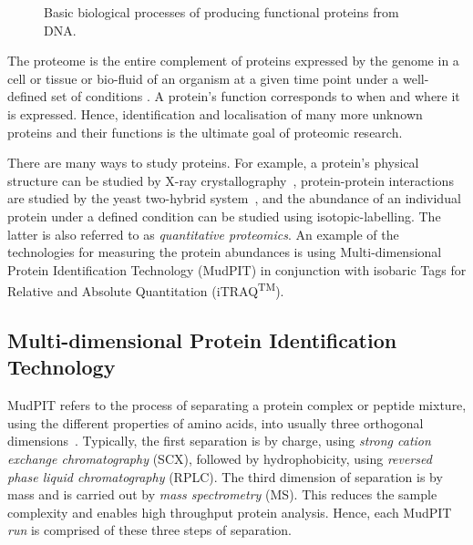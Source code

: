 \documentclass[11pt,a4paper]{article}
\begin{document}
\begin{figure}[hbt]
\caption{Basic biological processes of producing functional proteins from DNA.}
\label{fig:processes}
\end{figure}

The proteome is the entire complement of proteins expressed by the genome in a cell or tissue or bio-fluid of an organism at a given time point under a well-defined set of conditions \citep{Boehm2007}. A protein's function corresponds to when and where it is expressed. Hence, identification and localisation of many more unknown proteins and their functions is the ultimate goal of proteomic research. 

There are many ways to study proteins. For example, a protein's physical structure can be studied by X-ray crystallography~\citep{Blow2002}, protein-protein interactions are studied by the yeast two-hybrid system~\citep{Fields1989}, and the abundance of an individual protein under a defined condition can be studied using isotopic-labelling. The latter is also referred to as \emph{quantitative proteomics}. An example of the technologies for measuring the protein abundances is using Multi-dimensional Protein Identification Technology (MudPIT) in conjunction with isobaric Tags for Relative and Absolute Quantitation (iTRAQ\textsuperscript{TM}). 

\subsection{Multi-dimensional Protein Identification Technology} \label{subsec:MudPIT}
MudPIT refers to the process of separating a protein complex or peptide mixture, using the different properties of amino acids, into usually three orthogonal dimensions~\citep{Washburn2001}. Typically, the first separation is by charge, using \emph{strong cation exchange chromatography} (SCX), followed by hydrophobicity, using \emph{reversed phase liquid chromatography} (RPLC). The third dimension of separation is by mass and is carried out by \emph{mass spectrometry} (MS). This reduces the sample complexity and enables high throughput protein analysis. Hence, each  MudPIT \emph{run} is comprised of these three steps of separation.
\end{document}
